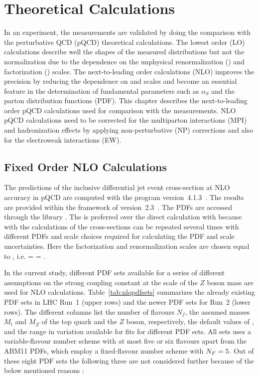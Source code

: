 \chapter{Theoretical Calculations}
\label{chap:Theory_Predictions}

In an experiment, the measurements are validated by doing the comparison with the perturbative QCD (pQCD) theoretical calculations. The lowest order (LO) calculations describe well the shapes of the measured distributions but not the normalization due to the dependence on the unphysical renormalization (\mur) and factorization (\muf) scales. The next-to-leading order calculations (NLO) improves the precision by reducing the dependence on \mur and \muf scales and become an essential feature in the determination of fundamental parameters such as $\alpha_S$ and the parton distribution functions (PDF). This chapter describes the next-to-leading order pQCD calculations used for comparison with the measurements. NLO pQCD calculations need to be corrected for the multiparton interactions (MPI) and hadronization effects by applying non-perturbative (NP) corrections and also for the electroweak interactions (EW).

\section{Fixed Order NLO Calculations}
The predictions of the inclusive differential jet event cross-section at NLO accuracy in pQCD are computed with the \NLOJETPP program version~4.1.3~\cite{Nagy:2001fj,Nagy:2003tz}. The results are provided within the framework of \fastNLO version~2.3~\cite{Kluge:2006xs,Britzger:2012bs}. The PDFs are accessed through the \LHAPDFS library \cite{Whalley:2005nh,Buckley:2014ana}. The \fastNLO is preferred over the direct calculation with \NLOJETPP because with \fastNLO the calculations of the cross-sections can be repeated several times with different PDFs and scale choices required for calculating the PDF and scale uncertainties. Here the factorization and renormalization scales are chosen equal to \httwo, i.e. \muf = \mur = \httwo. 

In the current study, different PDF sets available for a series of different assumptions on the strong coupling constant at the scale of the $Z$ boson mass \alpsmz are used for NLO calculations. Table~\ref{tab:nlopdfsets} summarizes the already existing PDF sets in LHC Run~1 (upper rows) and the newer PDF sets for Run~2 (lower rows). The different columns list the number of flavours $N_f$, the assumed masses $M_t$ and $M_Z$ of the top quark and the $Z$ boson, respectively, the default values of \alpsmz, and the range in \alpsmz variation available for fits for different PDF sets. All sets uses a variable-flavour number scheme with at most five or six flavours apart from the ABM11 PDFs, which employ a fixed-flavour number scheme with $N_F=5$. Out of these eight PDF sets the following three are not considered further because of the below mentioned reasons :

